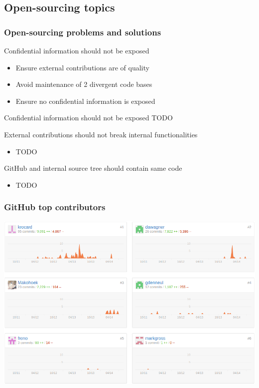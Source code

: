 \subsection{Open-sourcing topics}
\begin{frame}
    \frametitle{Open-sourcing problems and solutions}
    \begin{block}{Confidential information should not be exposed}
        \begin{itemize}
            \item Ensure external contributions are of quality
            \item Avoid maintenance of 2 divergent code bases
            \item Ensure no confidential information is exposed
        \end{itemize}
    \end{block}
    \begin{block}{Confidential information should not be exposed}
            TODO
    \end{block}
    \begin{block}{External contributions should not break internal functionalities}
        \begin{itemize}
            \item TODO
        \end{itemize}
    \end{block}
    \begin{block}{GitHub and internal source tree should contain same code}
        \begin{itemize}
            \item TODO
        \end{itemize}
    \end{block}
\end{frame}

\begin{frame}
    \frametitle{GitHub top contributors}
    \centering
    \includegraphics[width=\textwidth]{../../report/src/img/statsGitHub.png}
\end{frame}

